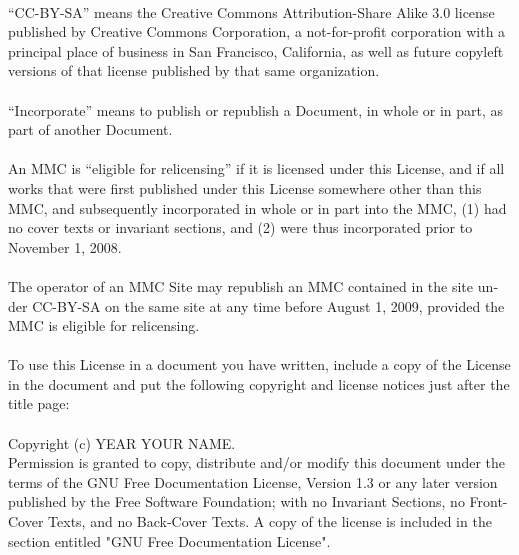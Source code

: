 \documentclass[11pt,a5paper,twoside]{book}
\begin{document}
\begin{english}
\paragraph{} “CC-BY-SA” means the Creative Commons Attribution-Share Alike 3.0 
license published by Creative Commons Corporation, a not-for-profit 
corporation with a principal place of business in San Francisco, 
California, as well as future copyleft versions of that license 
published by that same organization.
\paragraph{} “Incorporate” means to publish or republish a Document, in whole or in 
part, as part of another Document.
\paragraph{} An MMC is “eligible for relicensing” if it is licensed under this 
License, and if all works that were first published under this License 
somewhere other than this MMC, and subsequently incorporated in whole or 
in part into the MMC, (1) had no cover texts or invariant sections, and 
(2) were thus incorporated prior to November 1, 2008.
\paragraph{} The operator of an MMC Site may republish an MMC contained in the site
under CC-BY-SA on the same site at any time before August 1, 2009,
provided the MMC is eligible for relicensing.
\paragraph{} To use this License in a document you have written, include a copy of
the License in the document and put the following copyright and
license notices just after the title page:\\
\\
{\ttfamily
    Copyright (c)  YEAR  YOUR NAME.\\

    Permission is granted to copy, distribute and/or modify this document
    under the terms of the GNU Free Documentation License, Version 1.3
    or any later version published by the Free Software Foundation;
    with no Invariant Sections, no Front-Cover Texts, and no Back-Cover Texts.
    A copy of the license is included in the section entitled "GNU
    Free Documentation License".
}

\end{english}
\end{document}
